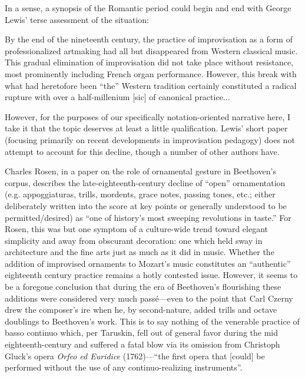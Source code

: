     In a sense, a synopsis of the Romantic period could begin and end with George Lewis' terse assessment of the situation:

    \begin{smallquote}
        By the end of the nineteenth century, the practice of improvisation as a form of professionalized artmaking had all but disappeared from Western classical music. This gradual elimination of improvisation did not take place without resistance, most prominently including French organ performance. However, this break with what had heretofore been ``the'' Western tradition certainly constituted a radical rupture with over a half-millenium [sic] of canonical practice...\autocite{Lewis_2007}
    \end{smallquote}

    However, for the purposes of our specifically notation-oriented narrative here, I take it that the topic deserves at least a little qualification. Lewis' short paper (focusing primarily on recent developments in improvisation pedagogy) does not attempt to account for this decline, though a number of other authors have.

    Charles Rosen, in a paper on the role of ornamental gesture in Beethoven's corpus, describes the late-eighteenth-century decline of ``open'' ornamentation (e.g. appoggiaturas, trills, mordents, grace notes, passing tones, etc.; either deliberately written into the score at key points or generally understood to be permitted/desired) as ``one of history's most sweeping revolutions in taste.'' For Rosen, this was but one symptom of a culture-wide trend toward elegant simplicity and away from obscurant decoration: one which held sway in architecture and the fine arts just as much as it did in music. Whether the addition of improvised ornaments to Mozart's music constitutes an ``authentic'' eighteenth century practice remains a hotly contested issue. However, it seems to be a foregone conclusion that during the era of Beethoven's flourishing these additions were considered very much passé---even to the point that Carl Czerny drew the composer's ire when he, by second-nature, added trills and octave doublings to Beethoven's work.\autocite[1198--9]{Rosen_1970} This is to say nothing of the venerable practice of basso continuo which, per Taruskin, fell out of general favor during the mid eighteenth-century\autocite[428]{Taruskin_2009a} and suffered a fatal blow via its omission from Christoph Gluck's opera \textit{Orfeo ed Euridice} (1762)---``the first opera that [could] be performed without the use of any continuo-realizing instruments''.\autocite[457]{Taruskin_2009b}

